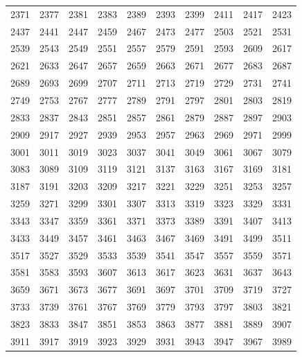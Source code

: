 \documentclass{article}
\begin{document}

\begin{tabular}{ccccccccc}
2371 & 2377 & 2381 & 2383 & 2389 & 2393 & 2399 & 2411 & 2417 & 2423 \\
2437 & 2441 & 2447 & 2459 & 2467 & 2473 & 2477 & 2503 & 2521 & 2531 \\
2539 & 2543 & 2549 & 2551 & 2557 & 2579 & 2591 & 2593 & 2609 & 2617 \\
2621 & 2633 & 2647 & 2657 & 2659 & 2663 & 2671 & 2677 & 2683 & 2687 \\
2689 & 2693 & 2699 & 2707 & 2711 & 2713 & 2719 & 2729 & 2731 & 2741 \\
2749 & 2753 & 2767 & 2777 & 2789 & 2791 & 2797 & 2801 & 2803 & 2819 \\
2833 & 2837 & 2843 & 2851 & 2857 & 2861 & 2879 & 2887 & 2897 & 2903 \\
2909 & 2917 & 2927 & 2939 & 2953 & 2957 & 2963 & 2969 & 2971 & 2999 \\
3001 & 3011 & 3019 & 3023 & 3037 & 3041 & 3049 & 3061 & 3067 & 3079 \\
3083 & 3089 & 3109 & 3119 & 3121 & 3137 & 3163 & 3167 & 3169 & 3181 \\
3187 & 3191 & 3203 & 3209 & 3217 & 3221 & 3229 & 3251 & 3253 & 3257 \\
3259 & 3271 & 3299 & 3301 & 3307 & 3313 & 3319 & 3323 & 3329 & 3331 \\
3343 & 3347 & 3359 & 3361 & 3371 & 3373 & 3389 & 3391 & 3407 & 3413 \\
3433 & 3449 & 3457 & 3461 & 3463 & 3467 & 3469 & 3491 & 3499 & 3511 \\
3517 & 3527 & 3529 & 3533 & 3539 & 3541 & 3547 & 3557 & 3559 & 3571 \\
3581 & 3583 & 3593 & 3607 & 3613 & 3617 & 3623 & 3631 & 3637 & 3643 \\
3659 & 3671 & 3673 & 3677 & 3691 & 3697 & 3701 & 3709 & 3719 & 3727 \\
3733 & 3739 & 3761 & 3767 & 3769 & 3779 & 3793 & 3797 & 3803 & 3821 \\
3823 & 3833 & 3847 & 3851 & 3853 & 3863 & 3877 & 3881 & 3889 & 3907 \\
3911 & 3917 & 3919 & 3923 & 3929 & 3931 & 3943 & 3947 & 3967 & 3989
\end{tabular}
\end{document}
